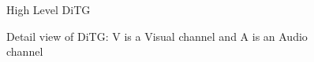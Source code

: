 
\begin{figure}[hbt]
\center
\setlength{\abovecaptionskip}{1mm}
\setlength{\belowcaptionskip}{1mm}
\setlength{\textfloatsep}{1mm}
\setlength{\floatsep}{1mm}
\caption{High Level DiTG}
\label{fig:ditg}
\end{figure}

\begin{figure}[hbt]
\center
\setlength{\abovecaptionskip}{1mm}
\setlength{\belowcaptionskip}{1mm}
\setlength{\textfloatsep}{1mm}
\setlength{\floatsep}{1mm}
\caption{Detail view of DiTG: V is a Visual channel and A is an Audio channel}
\label{fig:ditg_detail}
\end{figure}


%
%

